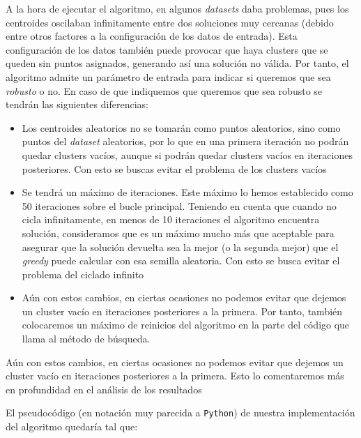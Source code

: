 \documentclass[11pt]{article}
\begin{document}
A la hora de ejecutar el algoritmo, en algunos \emph{datasets} daba problemas, pues los centroides oscilaban infinitamente entre dos soluciones muy cercanas (debido entre otros factores a la configuración de los datos de entrada). Esta configuración de los datos también puede provocar que haya clusters que se queden sin puntos asignados, generando así una solución no válida. Por tanto, el algoritmo admite un parámetro de entrada para indicar si queremos que sea \emph{robusto} o no. En caso de que indiquemos que queremos que sea robusto se tendrán las siguientes diferencias:

\begin{itemize}
    \item Los centroides aleatorios no se tomarán como puntos aleatorios, sino como puntos del \emph{dataset} aleatorios, por lo que en una primera iteración no podrán quedar clusters vacíos, aunque si podrán quedar clusters vacíos en iteraciones posteriores. Con esto se buscas evitar el problema de los clusters vacíos
    \item Se tendrá un máximo de iteraciones. Este máximo lo hemos establecido como 50 iteraciones sobre el bucle principal. Teniendo en cuenta que cuando no cicla infinitamente, en menos de 10 iteraciones el algoritmo encuentra solución, consideramos que es un máximo mucho más que aceptable para asegurar que la solución devuelta sea la mejor (o la segunda mejor) que el \emph{greedy} puede calcular con esa semilla aleatoria. Con esto se busca evitar el problema del ciclado infinito
    \item Aún con estos cambios, en ciertas ocasiones no podemos evitar que dejemos un cluster vacío en iteraciones posteriores a la primera. Por tanto, también colocaremos un máximo de reinicios del algoritmo en la parte del código que llama al método de búsqueda.
\end{itemize}

Aún con estos cambios, en ciertas ocasiones no podemos evitar que dejemos un cluster vacío en iteraciones posteriores a la primera. Esto lo comentaremos más en profundidad en el análisis de los resultados

El pseudocódigo (en notación muy parecida a \lstinline{Python}) de nuestra implementación del algoritmo quedaría tal que:
\end{document}
